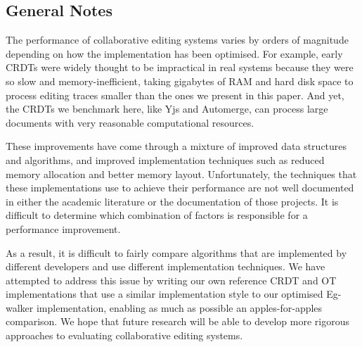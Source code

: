 \documentclass[sigplan,10pt]{acmart}
\begin{document}
\subsection{General Notes}

The performance of collaborative editing systems varies by orders of magnitude depending on how the implementation has been optimised. For example, early CRDTs were widely thought to be impractical in real systems because they were so slow and memory-inefficient, taking gigabytes of RAM and hard disk space to process editing traces smaller than the ones we present in this paper. And yet, the CRDTs we benchmark here, like Yjs and Automerge, can process large documents with very reasonable computational resources.

These improvements have come through a mixture of improved data structures and algorithms, and improved implementation techniques such as reduced memory allocation and better memory layout.
Unfortunately, the techniques that these implementations use to achieve their performance are not well documented in either the academic literature or the documentation of those projects.
It is difficult to determine which combination of factors is responsible for a performance improvement.

As a result, it is difficult to fairly compare algorithms that are implemented by different developers and use different implementation techniques.
We have attempted to address this issue by writing our own reference CRDT and OT implementations that use a similar implementation style to our optimised Eg-walker implementation, enabling as much as possible an apples-for-apples comparison.
We hope that future research will be able to develop more rigorous approaches to evaluating collaborative editing systems.
\end{document}

